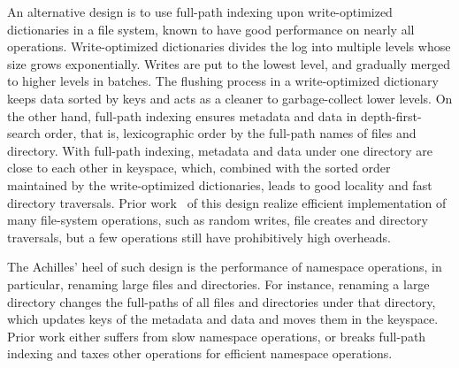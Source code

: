 An alternative design is to use full-path indexing upon write-optimized
dictionaries in a file system, known to have good performance on nearly all
operations.
Write-optimized dictionaries divides the log into multiple levels whose size
grows exponentially.
Writes are put to the lowest level, and gradually merged to higher levels in
batches.
The flushing process in a write-optimized dictionary keeps data sorted by keys
and acts as a cleaner to garbage-collect lower levels.
On the other hand, full-path indexing ensures metadata and data in
depth-first-search order, that is, lexicographic order by the full-path names
of files and directory.
With full-path indexing, metadata and data under one directory are close to each
other in keyspace, which, combined with the sorted order maintained by the
write-optimized dictionaries, leads to good locality and fast directory
traversals.
Prior work~\citep{betrfs1,betrfs1tos,betrfs2,betrfs2tos,betrfs3} of this design
realize efficient implementation of many file-system operations, such as random
writes, file creates and directory traversals,
but a few operations still have prohibitively high overheads.

The Achilles' heel of such design is the performance of namespace operations,
in particular, renaming large files and directories.
For instance, renaming a large directory changes the full-paths of all files
and directories under that directory, which updates keys of the metadata and
data and moves them in the keyspace.
Prior work either suffers from slow namespace operations, or
breaks full-path indexing and taxes other operations for efficient namespace
operations.

